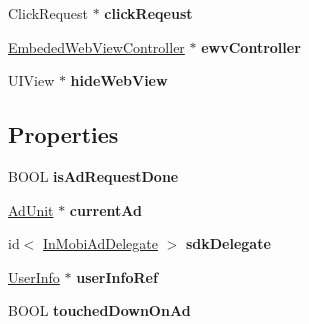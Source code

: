 \begin{DoxyCompactItemize}
\item 
\hypertarget{interface_in_mobi_ad_manager_ab29f5ecbf7be122c3a340bcee7922cdc}{
ClickRequest $\ast$ {\bfseries clickReqeust}}
\label{interface_in_mobi_ad_manager_ab29f5ecbf7be122c3a340bcee7922cdc}

\item 
\hypertarget{interface_in_mobi_ad_manager_a2711f9375fe18b65f35a7deb547110ce}{
\hyperlink{interface_embeded_web_view_controller}{EmbededWebViewController} $\ast$ {\bfseries ewvController}}
\label{interface_in_mobi_ad_manager_a2711f9375fe18b65f35a7deb547110ce}

\item 
\hypertarget{interface_in_mobi_ad_manager_a21f39b6b64425d012fc88780ad60f558}{
UIView $\ast$ {\bfseries hideWebView}}
\label{interface_in_mobi_ad_manager_a21f39b6b64425d012fc88780ad60f558}

\end{DoxyCompactItemize}
\subsection*{Properties}
\begin{DoxyCompactItemize}
\item 
\hypertarget{interface_in_mobi_ad_manager_a475b593a0a4985b7b776a53e3eddea12}{
BOOL {\bfseries isAdRequestDone}}
\label{interface_in_mobi_ad_manager_a475b593a0a4985b7b776a53e3eddea12}

\item 
\hypertarget{interface_in_mobi_ad_manager_a4687b204d8d8ee8114e4489c9c322c25}{
\hyperlink{interface_ad_unit}{AdUnit} $\ast$ {\bfseries currentAd}}
\label{interface_in_mobi_ad_manager_a4687b204d8d8ee8114e4489c9c322c25}

\item 
\hypertarget{interface_in_mobi_ad_manager_a935cd0ecafa8a76c5c57c1db809d6b51}{
id$<$ \hyperlink{protocol_in_mobi_ad_delegate-p}{InMobiAdDelegate} $>$ {\bfseries sdkDelegate}}
\label{interface_in_mobi_ad_manager_a935cd0ecafa8a76c5c57c1db809d6b51}

\item 
\hypertarget{interface_in_mobi_ad_manager_a8f0e3bc6ab9ee5b2682ff69ece737c7d}{
\hyperlink{interface_user_info}{UserInfo} $\ast$ {\bfseries userInfoRef}}
\label{interface_in_mobi_ad_manager_a8f0e3bc6ab9ee5b2682ff69ece737c7d}

\item 
\hypertarget{interface_in_mobi_ad_manager_a4d1dfe8ff8d63e73c69d62085b1865bd}{
BOOL {\bfseries touchedDownOnAd}}
\label{interface_in_mobi_ad_manager_a4d1dfe8ff8d63e73c69d62085b1865bd}

\end{DoxyCompactItemize}


